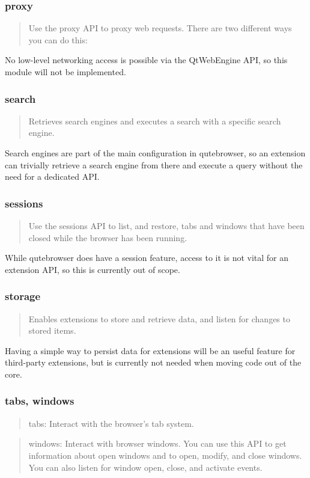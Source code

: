 \documentclass[a4paper,parskip=full,DIV=14,BCOR=15mm]{scrreprt}
\begin{document}
\subsubsection{proxy}
\begin{quote}
Use the proxy API to proxy web requests. There are two different ways you can do this:
\end{quote}

No low-level networking access is possible via the QtWebEngine API, so this
module will not be implemented.

\subsubsection{search}
\begin{quote}
Retrieves search engines and executes a search with a specific search engine.
\end{quote}

Search engines are part of the main configuration in qutebrowser, so an
extension can trivially retrieve a search engine from there and execute a query
without the need for a dedicated API.

\subsubsection{sessions}
\begin{quote}
Use the sessions API to list, and restore, tabs and windows that have been closed while the browser has been running.
\end{quote}

While qutebrowser does have a session feature, access to it is not vital for an
extension API, so this is currently out of scope.

\subsubsection{storage}
\begin{quote}
Enables extensions to store and retrieve data, and listen for changes to stored items.
\end{quote}

Having a simple way to persist data for extensions will be an useful feature for
third-party extensions, but is currently not needed when moving code out of the core.

\subsubsection{tabs, windows}
\begin{quote}
tabs: Interact with the browser's tab system.
\end{quote}
\begin{quote}
windows: Interact with browser windows. You can use this API to get information about open windows and to open, modify, and close windows. You can also listen for window open, close, and activate events.
\end{quote}
\end{document}
